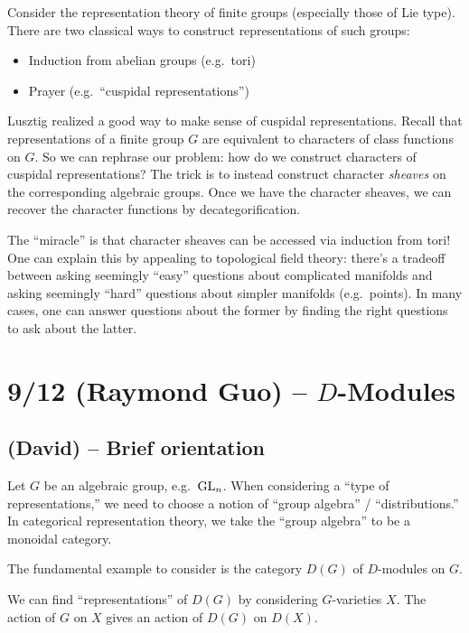 \documentclass{article}
\begin{document}
Consider the representation theory of finite groups (especially those of Lie type).
There are two classical ways to construct representations of such groups:
\begin{itemize}
	\item Induction from abelian groups (e.g.\ tori)
	\item Prayer (e.g.\ ``cuspidal representations'')
\end{itemize}
Lusztig realized a good way to make sense of cuspidal representations.
Recall that representations of a finite group $G$ are equivalent to characters of class functions on $G$.
So we can rephrase our problem: how do we construct characters of cuspidal representations?
The trick is to instead construct character \emph{sheaves} on the corresponding algebraic groups.
Once we have the character sheaves, we can recover the character functions by decategorification.

The ``miracle'' is that character sheaves can be accessed via induction from tori!
One can explain this by appealing to topological field theory: there's a tradeoff between asking seemingly ``easy'' questions about complicated manifolds and asking seemingly ``hard'' questions about simpler manifolds (e.g.\ points).
In many cases, one can answer questions about the former by finding the right questions to ask about the latter.

\section{9/12 (Raymond Guo) -- $D$-Modules}

\subsection{(David) -- Brief orientation}

Let $G$ be an algebraic group, e.g.\ $\operatorname{GL}_n$.
When considering a ``type of representations,'' we need to choose a notion of ``group algebra'' / ``distributions.''
In categorical representation theory, we take the ``group algebra'' to be a monoidal category.

\begin{ex}
	The fundamental example to consider is the category $D(G)$ of $D$-modules on $G$.
\end{ex}

We can find ``representations'' of $D(G)$ by considering $G$-varieties $X$.
The action of $G$ on $X$ gives an action of $D(G)$ on $D(X)$.
\end{document}
